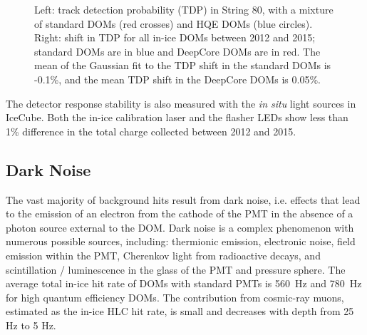 \begin{figure}[!h]
  \captionsetup[subfigure]{labelformat=empty}
  \centering
  \caption{Left: track detection probability (TDP) in String 80, with a
    mixture of standard DOMs (red crosses) and HQE DOMs (blue
    circles). Right: shift in TDP for all in-ice DOMs between 2012 and 2015; standard DOMs are in blue and
    DeepCore DOMs are in red. The mean of the Gaussian fit to
    the TDP shift in the standard DOMs is -0.1\%, and the mean 
    TDP shift in the DeepCore DOMs is 0.05\%.}
  \label{fig:tdp}
\end{figure}

The detector response stability is also measured with the {\it in
  situ} light sources in IceCube. Both the in-ice calibration laser
\cite{IC3:SC} and the flasher LEDs show less than 1\% difference in the total
charge collected between 2012 and 2015. 

\subsection{\label{sect:darknoise}Dark Noise}

The vast majority of background hits result from dark noise, i.e. effects
that lead to the emission of an electron from the cathode of the PMT in the
absence of a photon source external to the DOM. 
Dark noise is a complex phenomenon with numerous possible sources,
including: thermionic emission, electronic noise, field emission 
within the PMT, Cherenkov light from radioactive decays, and
scintillation / luminescence in the glass of the PMT and pressure sphere.
The average total in-ice hit rate of DOMs with standard PMTs is
\SI{560}{\hertz} and \SI{780}{\hertz} for high quantum efficiency DOMs. The
contribution from cosmic-ray muons, estimated as the in-ice HLC hit rate,
is small and decreases with depth from 25 Hz to 5 Hz. 


